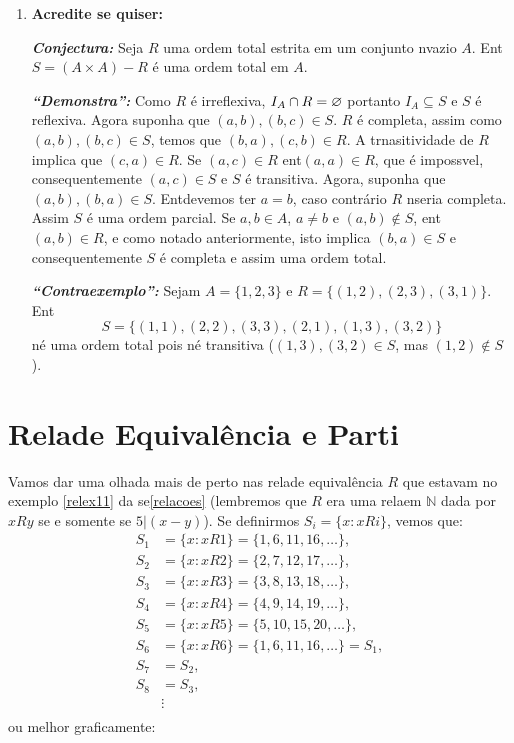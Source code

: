 \begin{enumerate}[{\bf 1.}]
\item {\bf Acredite se quiser:}  

\noindent \textit{\textbf{Conjectura:}} Seja $R$ uma ordem total estrita em um conjunto n\ao vazio $A$. Ent\ao $S=(A\times A)-R$ \'e uma ordem total em $A$. 

\noindent \textit{\textbf{``Demonstra\caoi'':}} Como $R$ \'e irreflexiva, $I_A\cap R=\varnothing$ portanto $I_A\subseteq S$ e $S$ \'e reflexiva. Agora suponha que $(a,b),(b,c)\in S$. $R$ \'e completa, assim como $(a,b),(b,c)\in S$, temos que $(b,a),(c,b)\in R$. A trnasitividade de $R$ implica que $(c,a)\in R$. Se $(a,c)\in R$ ent\ao $(a,a)\in R$, que \'e imposs\ih vel, consequentemente $(a,c)\in S$ e $S$ \'e transitiva. Agora, suponha que $(a,b),(b,a)\in S$. Ent\ao devemos ter $a=b$, caso contr\'ario $R$ n\ao seria completa. Assim $S$ \'e uma ordem parcial. Se $a,b\in A$, $a\neq b$ e $(a,b)\notin S$, ent\ao $(a,b)\in R$, e como notado anteriormente, isto implica $(b,a)\in S$ e consequentemente $S$ \'e completa e assim uma ordem total.

\noindent \textit{\textbf{``Contraexemplo'':}} Sejam $A=\{1,2,3\}$ e $R=\{(1,2),(2,3),(3,1)\}$. Ent\ao
\[
S=\{(1,1),(2,2),(3,3),(2,1),(1,3),(3,2)\}
\]
n\ao \'e uma ordem total pois n\ao \'e transitiva ($(1,3),(3,2)\in S$, mas $(1,2)\notin S$).
\end{enumerate}

\section{Rela\coes de Equival\^encia e Parti\cois}\label{equivalencia}

Vamos dar uma olhada mais de perto nas rela\coes de equival\^encia $R$ que estavam no exemplo \ref{relex11} da se\cao \ref{relacoes} (lembremos que $R$ era uma rela\cao em $\mathbb{N}$ dada por $xRy$ se e somente se $5|(x-y)$). Se definirmos $S_i=\{x: xRi\}$, vemos que:
\begin{equation*}
 \begin{aligned}
S_1&=\{x: xR1\}=\{1,6,11,16,\ldots\},\\
S_2&=\{x: xR2\}=\{2,7,12,17,\ldots\},\\
S_3&=\{x: xR3\}=\{3,8,13,18,\ldots\},\\
S_4&=\{x: xR4\}=\{4,9,14,19,\ldots\},\\
S_5&=\{x: xR5\}=\{5,10,15,20,\ldots\},\\
S_6&=\{x: xR6\}=\{1,6,11,16,\ldots\}=S_1,\\
S_7&=S_2,\\
S_8&=S_3,\\
& \vdots\\
 \end{aligned}
\end{equation*}
ou melhor graficamente:


